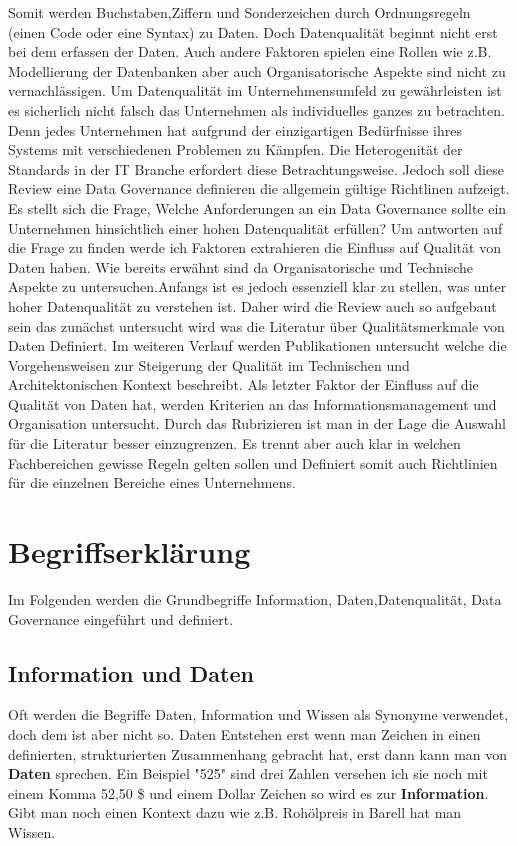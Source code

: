 \documentclass[12pt,a4paper,bibliography=totocnumbered,listof=totocnumbered]{scrartcl}
\begin{document}
Somit werden Buchstaben,Ziffern und Sonderzeichen durch Ordnungsregeln (einen Code oder eine Syntax) zu Daten.\cite{north}
Doch Datenqualität beginnt nicht erst bei dem erfassen der Daten.
Auch andere Faktoren spielen eine Rollen wie z.B. Modellierung der Datenbanken aber auch Organisatorische Aspekte sind nicht zu vernachlässigen. Um Datenqualität im Unternehmensumfeld zu gewährleisten ist es sicherlich nicht falsch das Unternehmen als individuelles ganzes zu betrachten. Denn jedes Unternehmen hat
aufgrund der einzigartigen Bedürfnisse ihres Systems mit verschiedenen Problemen zu Kämpfen. Die He­te­ro­ge­ni­tät der Standards in der IT Branche erfordert diese Betrachtungsweise. Jedoch soll diese Review eine Data Governance definieren die allgemein gültige Richtlinen aufzeigt. Es stellt sich die Frage, Welche Anforderungen an ein Data Governance sollte ein Unternehmen hinsichtlich einer hohen Datenqualität erfüllen? Um antworten auf die Frage zu finden werde ich Faktoren extrahieren die Einfluss auf Qualität von Daten haben. Wie bereits erwähnt sind da Organisatorische und Technische Aspekte zu untersuchen.Anfangs ist es jedoch essenziell klar zu stellen, was unter hoher Datenqualität zu verstehen ist. Daher wird die Review auch so aufgebaut sein das zunächst untersucht wird was die Literatur über Qualitätsmerkmale von Daten Definiert. Im weiteren Verlauf werden Publikationen untersucht welche die Vorgehensweisen zur Steigerung der Qualität im Technischen und Architektonischen Kontext beschreibt. Als letzter Faktor der Einfluss auf die Qualität von Daten hat, werden Kriterien an das Informationsmanagement und Organisation untersucht. Durch das Rubrizieren ist man in der Lage die Auswahl für die Literatur besser einzugrenzen. Es trennt aber auch klar in welchen Fachbereichen gewisse Regeln gelten sollen und Definiert somit auch Richtlinien für die einzelnen Bereiche eines Unternehmens. 

\newpage

\section{Begriffserklärung}
Im Folgenden werden die Grundbegriffe Information, Daten,Datenqualität, Data Governance eingeführt und definiert.
\subsection*{Information und Daten}
Oft werden die Begriffe Daten, Information und Wissen als Synonyme verwendet, doch dem ist aber nicht so. Daten Entstehen erst wenn man Zeichen in einen definierten, strukturierten Zusammenhang gebracht hat, erst dann kann man von \textbf{Daten} sprechen. Ein Beispiel
"525" sind drei Zahlen versehen ich sie noch mit einem Komma 52,50 \$ und einem Dollar Zeichen so wird es zur \textbf{Information}.
Gibt man noch einen Kontext dazu wie z.B. Rohölpreis in Barell hat man Wissen.   
\end{document}
